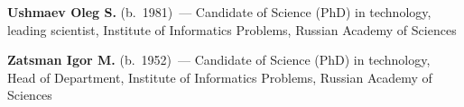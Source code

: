 \begin{multicols}{2}
\vspace*{6pt}

\noindent %
\textbf{Ushmaev Oleg S.} (b.\ 1981)~---
Candidate of Science (PhD) in technology, leading scientist,
Institute of Informatics Problems,  Russian Academy of Sciences

\vspace*{6pt}

\noindent
\textbf{Zatsman Igor M.} (b.\ 1952)~--- Candidate of Science (PhD) in technology, Head of Department, Institute
of Informatics Problems, Russian Academy of Sciences

\end{multicols}